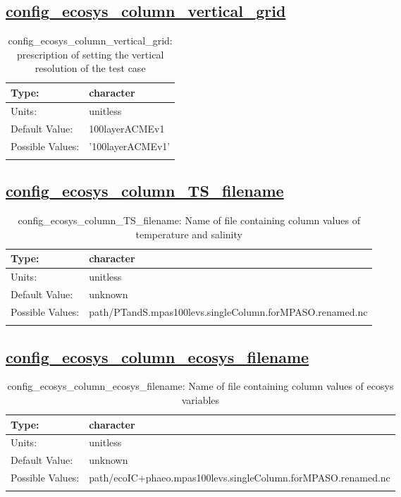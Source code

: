 \subsection[config\_ecosys\_column\_vertical\_grid]{\hyperref[sec:nm_tab_ecosys_column]{config\_ecosys\_column\_vertical\_grid}}
\label{subsec:nm_sec_config_ecosys_column_vertical_grid}
\begin{center}
\begin{longtable}{| p{2.0in} || p{4.0in} |}
    \hline
    Type: & character \\
    \hline
    Units: & \si{unitless} \\
    \hline
    Default Value: & 100layerACMEv1 \\
    \hline
    Possible Values: & '100layerACMEv1' \\
    \hline
    \caption{config\_ecosys\_column\_vertical\_grid: prescription of setting the vertical resolution of the test case}
\end{longtable}
\end{center}
\subsection[config\_ecosys\_column\_TS\_filename]{\hyperref[sec:nm_tab_ecosys_column]{config\_ecosys\_column\_TS\_filename}}
\label{subsec:nm_sec_config_ecosys_column_TS_filename}
\begin{center}
\begin{longtable}{| p{2.0in} || p{4.0in} |}
    \hline
    Type: & character \\
    \hline
    Units: & \si{unitless} \\
    \hline
    Default Value: & unknown \\
    \hline
    Possible Values: & path/PTandS.mpas100levs.singleColumn.forMPASO.renamed.nc \\
    \hline
    \caption{config\_ecosys\_column\_TS\_filename: Name of file containing column values of temperature and salinity}
\end{longtable}
\end{center}
\subsection[config\_ecosys\_column\_ecosys\_filename]{\hyperref[sec:nm_tab_ecosys_column]{config\_ecosys\_column\_ecosys\_filename}}
\label{subsec:nm_sec_config_ecosys_column_ecosys_filename}
\begin{center}
\begin{longtable}{| p{2.0in} || p{4.0in} |}
    \hline
    Type: & character \\
    \hline
    Units: & \si{unitless} \\
    \hline
    Default Value: & unknown \\
    \hline
    Possible Values: & path/ecoIC+phaeo.mpas100levs.singleColumn.forMPASO.renamed.nc \\
    \hline
    \caption{config\_ecosys\_column\_ecosys\_filename: Name of file containing column values of ecosys variables}
\end{longtable}
\end{center}
